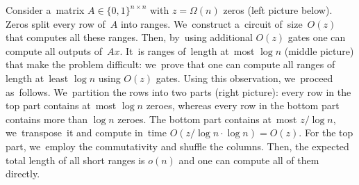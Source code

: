 \documentclass{toc}
\begin{document}
Consider a~matrix $A \in \{0,1\}^{n \times n}$
with $z=\Omega(n)$ zeros (left picture below).
Zeros split every row of~$A$ into ranges.
We~construct a~circuit of~size~$O(z)$ that computes all these ranges. Then, by~using additional $O(z)$ gates one can
compute all outputs of~$Ax$. It~is ranges of~length at~most $\log n$ (middle picture) that make the problem difficult:
we~prove that one can compute
all ranges of length at~least $\log n$ using $O(z)$ gates.
Using this observation, we~proceed as~follows.
We~partition the rows into two parts (right picture): every row in the top part contains at~most $\log n$ zeroes, whereas every row in the bottom part contains more than $\log n$ zeroes. The bottom part contains at~most $z/\log n$, we~transpose~it and compute in~time $O(z/\log n \cdot \log n)=O(z)$. For the top part, we~employ the commutativity and shuffle the columns. Then, the expected total length of all short ranges is $o(n)$ and one can
compute all of them directly.
\end{document}
